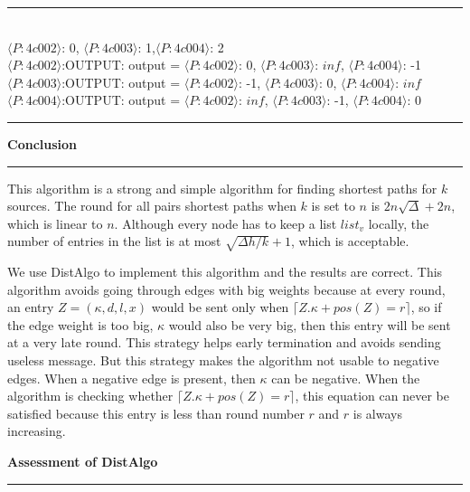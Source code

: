 \documentclass[11pt]{article}  %
\begin{document}
\noindent
\rule{5in}{.1pt}
\noindent \\
{$\langle P:4c002\rangle $: 0, $\langle P:4c003\rangle$: 1,$\langle P:4c004\rangle$: 2}\\
$\langle P:4c002\rangle$:OUTPUT: output = {$\langle P:4c002\rangle$: 0, $\langle P:4c003\rangle$: $inf$, $\langle P:4c004\rangle$: -1}\\
$\langle P:4c003\rangle$:OUTPUT: output = {$\langle P:4c002\rangle$: -1, $\langle P:4c003\rangle$: 0, $\langle P:4c004\rangle$: $inf$}\\
$\langle P:4c004\rangle$:OUTPUT: output = {$\langle P:4c002\rangle$: $inf$, $\langle P:4c003\rangle$: -1, $\langle P:4c004\rangle$: 0}\\
\rule{5in}{.1pt}\par


{\bf Conclusion}

\rule{6in}{.1pt}       %

This algorithm is a strong and simple algorithm for finding shortest paths for $k$ sources. The round for all pairs shortest paths when $k$ is set to $n$ is $2n\sqrt{\Delta} +2n$, which is linear to $n$. Although every node has to keep a list $list_v$ locally, the number of entries in the list is at most $\sqrt{\Delta h/k}+1$, which is acceptable. 

We use DistAlgo to implement this algorithm and the results are correct. This algorithm avoids going through edges with big weights because at every round, an entry $Z=(\kappa, d, l, x)$ would be sent only when $\lceil Z.\kappa + pos(Z) = r \rceil $, so if the edge weight is too big, $\kappa$ would also be very big, then this entry will be sent at a very late round. This strategy helps early termination and avoids sending useless message. But this strategy makes the algorithm not usable to negative edges. When a negative edge is present, then $\kappa$ can be negative. When the algorithm is checking whether $\lceil Z.\kappa + pos(Z) = r \rceil $, this equation can never be satisfied because this entry is less than round number $r$ and $r$ is always increasing.

{\bf Assessment of DistAlgo}

\rule{6in}{.1pt}       %
\end{document}
